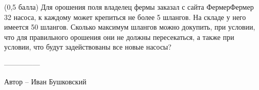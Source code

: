 \question
(0,5 балла) Для орошения поля владелец фермы заказал с сайта ФермерФермер 32 насоса, к каждому может крепиться не более 5 шлангов. На складе у него имеется 50 шлангов. Сколько максимум шлангов можно докупить, при условии, что для правильного орошения они не должны пересекаться, а также при условии, что будут задействованы все новые насосы?

---------------

Автор -- Иван Бушковский
